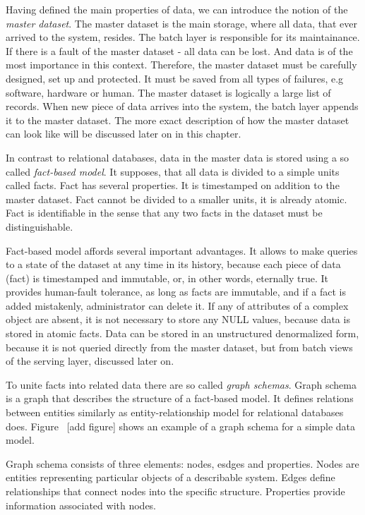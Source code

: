 Having defined the main properties of data, we can introduce the notion of the \textit{master dataset}.
The master dataset is the main storage, where all data, that ever arrived to the system, resides.
The batch layer is responsible for its maintainance.
If there is a fault of the master dataset - all data can be lost.
And data is of the most importance in this context.
Therefore, the master dataset must be carefully designed, set up and protected.
It must be saved from all types of failures, e.g software, hardware or human.
The master dataset is logically a large list of records.
When new piece of data arrives into the system, the batch layer appends it to the master dataset.
The more exact description of how the master dataset can look like will be discussed later on in this chapter.

In contrast to relational databases, data in the master data is stored using a so called \textit{fact-based model}.
It supposes, that all data is divided to a simple units called facts.
Fact has several properties.
It is timestamped on addition to the master dataset.
Fact cannot be divided to a smaller units, it is already atomic.
Fact is identifiable in the sense that any two facts in the dataset must be distinguishable.

Fact-based model affords several important advantages.
It allows to make queries to a state of the dataset at any time in its history, because each piece of data (fact) is timestamped and immutable, or, in other words, eternally true.
It provides human-fault tolerance, as long as facts are immutable, and if a fact is added mistakenly, administrator can delete it.
If any of attributes of a complex object are absent, it is not necessary to store any NULL values, because data is stored in atomic facts.
Data can be stored in an unstructured denormalized form, because it is not queried directly from the master dataset, but from batch views of the serving layer, discussed later on.

To unite facts into related data there are so called \textit{graph schemas}.
Graph schema is a graph that describes the structure of a fact-based model.
It defines relations between entities similarly as entity-relationship model for relational databases does.
Figure~ [add figure] shows an example of a graph schema for a simple data model.

Graph schema consists of three elements: nodes, esdges and properties.
Nodes are entities representing particular objects of a describable system.
Edges define relationships that connect nodes into the specific structure.
Properties provide information associated with nodes.

